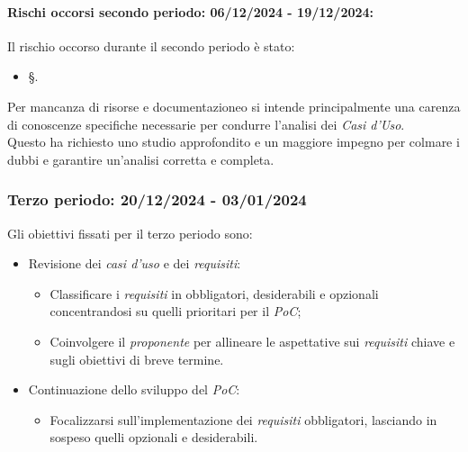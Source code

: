 \paragraph{Rischi occorsi secondo periodo: 06/12/2024 - 19/12/2024: }
Il rischio occorso durante il secondo periodo è stato:
\begin{itemize}
    \item \S{}.
\end{itemize}
Per mancanza di risorse e documentazioneo si intende principalmente una carenza di conoscenze specifiche necessarie per condurre l’analisi dei \emph{Casi d’Uso}.\\
Questo ha richiesto uno studio approfondito e un maggiore impegno per colmare i dubbi e garantire un’analisi corretta e completa. 


\newpage
\subsubsection{Terzo periodo: 20/12/2024 - 03/01/2024}  
\label{sec:prev_cons_terzo_periodo}  

Gli obiettivi fissati per il terzo periodo sono:  
\begin{itemize}  
    \item Revisione dei \emph{casi d’uso} e dei \emph{requisiti}: 
    \begin{itemize}  
        \item Classificare i \emph{requisiti} in obbligatori, desiderabili e opzionali concentrandosi su quelli prioritari per il \emph{PoC};  
        \item Coinvolgere il \emph{proponente} per allineare le aspettative sui \emph{requisiti} chiave e sugli obiettivi di breve termine.  
    \end{itemize}  
    \item Continuazione dello sviluppo del \emph{PoC}:
    \begin{itemize}  
        \item Focalizzarsi sull’implementazione dei \emph{requisiti} obbligatori, lasciando in sospeso quelli opzionali e desiderabili.    
    \end{itemize}   
\end{itemize} 

